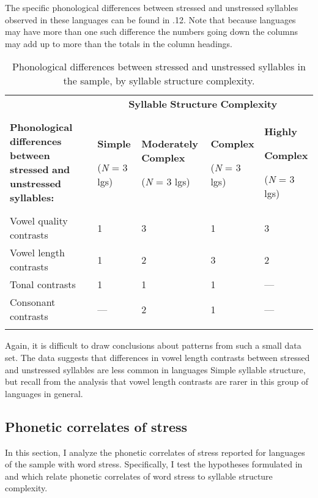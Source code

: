   The specific phonological differences between stressed and unstressed syllables observed in these languages can be found in .12. Note that because languages may have more than one such difference the numbers going down the columns may add up to more than the totals in the column headings.

\begin{table}
\begin{tabularx}{\textwidth}{XXXXX}
\lsptoprule
 & \multicolumn{4}{c}{ \textbf{Syllable} \textbf{Structure} \textbf{Complexity}}\\
 \textbf{Phonological} \textbf{differences} \textbf{between} \textbf{stressed} \textbf{and} \textbf{unstressed} \textbf{syllables:} & { \textbf{Simple}}

 (\textit{N} = 3 lgs) & { \textbf{Moderately} \textbf{Complex}}

 (\textit{N} = 3 lgs) & { \textbf{Complex}}

 (\textit{N} = 3 lgs) & { \textbf{Highly} }

{ \textbf{Complex}}

 (\textit{N} = 3 lgs)\\
 Vowel quality contrasts & 1 & 3 & 1 & 3\\
 Vowel length contrasts & 1 & 2 & 3 & 2\\
 Tonal contrasts & 1 & 1 & 1 & —\\
 Consonant contrasts & — & 2 & 1 & —\\
\lspbottomrule
\end{tabularx}
\caption{\label{5.12}Phonological differences between stressed and unstressed syllables in the sample, by syllable structure complexity.}
\end{table}

  Again, it is difficult to draw conclusions about patterns from such a small data set. The data suggests that differences in vowel length contrasts between stressed and unstressed syllables are less common in languages Simple syllable structure, but recall from the analysis  that vowel length contrasts are rarer in this group of languages in general.

\subsection{Phonetic correlates of stress}\label{sec:5.4.5}

  In this section, I analyze the phonetic correlates of stress reported for languages of the sample with word stress. Specifically, I test the hypotheses formulated in  and  which relate phonetic correlates of word stress to syllable structure complexity.

